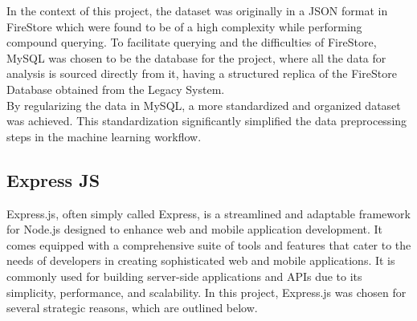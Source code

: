 In the context of this project, the dataset was originally in a JSON format in FireStore which were found to be of a high complexity while performing compound querying. To facilitate querying and the 
difficulties of FireStore, MySQL was chosen to be the database for the project, where all the data for analysis is sourced directly from it, having a structured replica of the FireStore Database
obtained from the Legacy System.\\
By regularizing the data in MySQL, a more standardized and organized dataset was achieved. This standardization significantly simplified the data preprocessing steps in the machine learning workflow.


\subsection{Express JS}
Express.js, often simply called Express, is a streamlined and adaptable framework for Node.js designed to enhance web and mobile application development. It comes equipped with a comprehensive suite of tools and features that cater to the needs of developers in creating sophisticated web and mobile applications.
It is commonly used for building server-side applications and APIs due to its simplicity, performance, and scalability. In this project, Express.js was chosen for several strategic reasons, which are outlined below.\cite{express}


